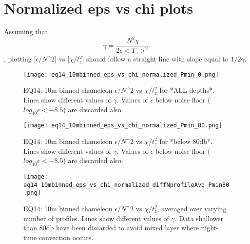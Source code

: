 \documentclass[11pt]{article}
\begin{document}
\clearpage
\section{Normalized eps vs chi plots}

Assuming that
\begin{equation}
\gamma=\frac{N^2 \chi}{2\epsilon<T_z>^2}
\end{equation}
, plotting [$\epsilon/N\^2$] vs [$\chi/t_{z}^{2}$] should follow a straight line with slope equal to $1/2\gamma$.


\begin{figure}[htbp]
\texttt{[image: eq14\_10mbinned\_eps\_vs\_chi\_normalized\_Pmin\_0.png]}
\caption{EQ14: 10m binned  chameleon $\epsilon/N\^2$ vs $\chi/t_{z}^{2}$ for *ALL depths*. Lines show different values of $\gamma$. Values of $\epsilon$ below noise floor ($log_{10}\epsilon<-8.5$) are discarded also.}
\label{}
\end{figure}

\begin{figure}[htbp]
\texttt{[image: eq14\_10mbinned\_eps\_vs\_chi\_normalized\_Pmin\_80.png]}
\caption{EQ14: 10m binned  chameleon $\epsilon/N\^2$ vs $\chi/t_{z}^{2}$ for *below 80db*. Lines show different values of $\gamma$. Values of $\epsilon$ below noise floor ($log_{10}\epsilon<-8.5$) are discarded also.}
\label{}
\end{figure}




\begin{figure}[htbp]
\texttt{[image: eq14\_10mbinned\_eps\_vs\_chi\_normalized\_diffNprofileAvg\_Pmin80.png]}
\caption{EQ14: 10m binned  chameleon $\epsilon/N\^2$ vs $\chi/t_{z}^{2}$, averaged over varying number of profiles. Lines show different values of $\gamma$. Data shallower than 80db have been discarded to avoid mixed layer where night-time convection occurs.}
\label{}
\end{figure}
\end{document}
